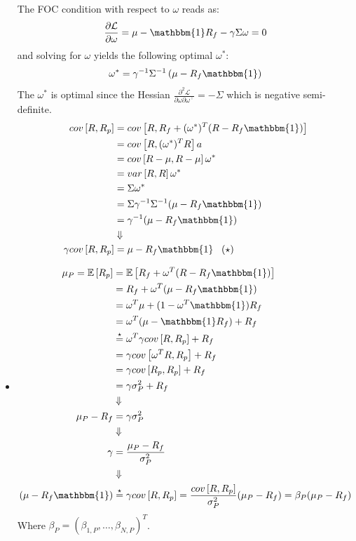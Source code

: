 \documentclass[10pt]{article}
\newcommand{\Lcal}{\mathcal{L}}
\newcommand{\Ebb}{\mathbb{E}}
\newenvironment{exercise}[2][Exercise]{\begin{trivlist}
  \item[\hskip \labelsep {\bfseries #1}\hskip \labelsep {\bfseries #2.}]}{\end{trivlist}}
\begin{document}
\begin{exercise}{1}
\begin{itemize}
    The FOC condition with respect to $\omega$ reads as:
    \begin{align*}
      \frac{\partial \Lcal}{\partial \omega} = \mu - \mathbbm{1} R_f - \gamma \Sigma \omega = 0
    \end{align*}
    and solving for $\omega$ yields the following optimal $\omega^*$:
    \begin{align*}
      \omega^* = \gamma^{-1}\Sigma^{-1} \left( \mu - R_f \mathbbm{1} \right)
    \end{align*}
    The $\omega^*$ is optimal since the Hessian $\frac{\partial^2 \Lcal}{\partial \omega\partial \omega^\top} =
    -\Sigma$ which is negative semi-definite.
      \begin{align*}
        cov \left[R, R_p \right] &= cov \left[ R, R_f + (\omega^*)^T(R - R_f\mathbbm{1}) \right] \\
        &= cov \left[ R, (\omega^*)^T R \right]a \\
        &= cov \left[ R - \mu, R - \mu \right] \omega^* \\
        &= var \left[ R, R \right] \omega^* \\
        &= \Sigma \omega^* \\
        &= \Sigma \gamma^{-1} \Sigma^{-1} (\mu - R_f \mathbbm{1}) \\
        &=\gamma^{-1}(\mu - R_f \mathbbm{1}) \\
        &\Downarrow \\
          \gamma cov\left[ R, R_p \right]&= \mu - R_f\mathbbm{1} \;\;\; (\star)
      \end{align*}
      \item
        \begin{align*}
          \mu_P = \Ebb\left[ R_p \right] &= \Ebb\left[ R_f + \omega^T(R - R_f\mathbbm{1}) \right] \\
          &= R_f + \omega^T ( \mu - R_f \mathbbm{1}) \\                                         &= \omega^T \mu + (1 - \omega^T \mathbbm{1}) R_f \\
          &= \omega^T(\mu - \mathbbm{1}R_f) + R_f \\
          &\stackrel{\star}{=} \omega^T\gamma cov\left[ R, R_p \right] + R_f \\
          &= \gamma cov \left[ \omega^TR, R_p \right]+ R_f \\
          &= \gamma cov \left[ R_p, R_p \right] + R_f\\
          &= \gamma \sigma^2_P  + R_f\\
          &\Downarrow \\
          \mu_P - R_f &= \gamma \sigma_P^2\\
          &\Downarrow \\
          \gamma &= \frac{\mu_P - R_f}{\sigma_P^2}\\
          & \Downarrow \\
          (\mu - R_f \mathbbm{1}) &\stackrel{\star}{=} \gamma cov\left[ R, R_p \right] = \frac{cov\left[ R, R_p \right]}{\sigma_P^2} (\mu_P - R_f) = \beta_{P} (\mu_P - R_f)
          \end{align*}
          Where $\beta_{P} = (\beta_{1, P}, \ldots, \beta_{N, P})^T$.


\end{itemize}
\end{exercise}
\end{document}
